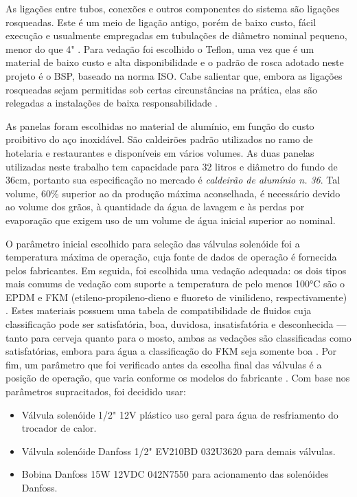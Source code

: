 As ligações entre tubos, conexões e outros componentes do sistema são ligações rosqueadas. Este é um meio de ligação antigo, porém de baixo custo, fácil execução e usualmente empregadas em tubulações de diâmetro nominal pequeno, menor do que 4" \cite{ifba}. Para vedação foi escolhido o Teflon, uma vez que é um material de baixo custo e alta disponibilidade e o padrão de rosca adotado neste projeto é o BSP, baseado na norma ISO. Cabe salientar que, embora as ligações rosqueadas sejam permitidas sob certas circunstâncias na prática, elas são relegadas a instalações de baixa responsabilidade \cite{ifba}.

As panelas foram escolhidas no material de alumínio, em função do custo proibitivo do aço inoxidável. São caldeirões padrão utilizados no ramo de hotelaria e restaurantes e disponíveis em vários volumes. As duas panelas utilizadas neste trabalho tem capacidade para 32 litros e diâmetro do fundo de 36cm, portanto sua especificação no mercado é \textit{caldeirão de alumínio n. 36}. Tal volume, 60\% superior ao da produção máxima aconselhada, é necessário devido ao volume dos grãos, à quantidade da água de lavagem e às perdas por evaporação que exigem uso de um volume de água inicial superior ao nominal.

O parâmetro inicial escolhido para seleção das válvulas solenóide foi a temperatura máxima de operação, cuja fonte de dados de operação é fornecida pelos fabricantes. Em seguida, foi escolhida uma vedação adequada: os dois tipos mais comums de vedação com suporte a temperatura de pelo menos 100\si{\degree}C são o EPDM e FKM (etileno-propileno-dieno e fluoreto de vinilideno, respectivamente) \cite{danfoss_solenoid}. Estes materiais possuem uma tabela de compatibilidade de fluidos cuja classificação pode ser satisfatória, boa, duvidosa, insatisfatória e desconhecida --- tanto para cerveja quanto para o mosto, ambas as vedações são classificadas como satisfatórias, embora para água a classificação do FKM seja somente boa \cite{epdm_fkm}. Por fim, um parâmetro que foi verificado antes da escolha final das válvulas é a posição de operação, que varia conforme os modelos do fabricante \cite{danfoss_solenoid}. Com base nos parâmetros supracitados, foi decidido usar:

\begin{itemize}
	\item Válvula solenóide 1/2" 12V plástico uso geral para água de resfriamento do trocador de calor.
	\item Válvula solenóide Danfoss 1/2" EV210BD 032U3620 para demais válvulas.
	\item Bobina Danfoss 15W 12VDC 042N7550 para acionamento das solenóides Danfoss.
\end{itemize}


